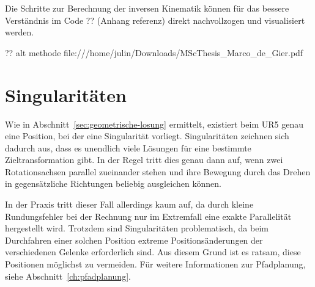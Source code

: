 Die Schritte zur Berechnung der inversen Kinematik können für das bessere Verständnis im Code ?? (Anhang referenz) direkt nachvollzogen und visualisiert werden.

?? alt methode file:///home/julin/Downloads/MScThesis\_Marco\_de\_Gier.pdf


\section{Singularitäten}\label{sec:singularitaten}

Wie in Abschnitt~\ref{sec:geometrische-losung} ermittelt, existiert beim UR5 genau eine Position, bei der eine Singularität vorliegt.
Singularitäten zeichnen sich dadurch aus, dass es unendlich viele Lösungen für eine bestimmte Zieltransformation gibt.
In der Regel tritt dies genau dann auf, wenn zwei Rotationsachsen parallel zueinander stehen und ihre Bewegung durch das Drehen in gegensätzliche Richtungen beliebig ausgleichen können.

In der Praxis tritt dieser Fall allerdings kaum auf, da durch kleine Rundungsfehler bei der Rechnung nur im Extremfall eine exakte Parallelität hergestellt wird.
Trotzdem sind Singularitäten problematisch, da beim Durchfahren einer solchen Position extreme Positionsänderungen der verschiedenen Gelenke erforderlich sind.
Aus diesem Grund ist es ratsam, diese Positionen möglichst zu vermeiden.
Für weitere Informationen zur Pfadplanung, siehe Abschnitt~\ref{ch:pfadplanung}.
